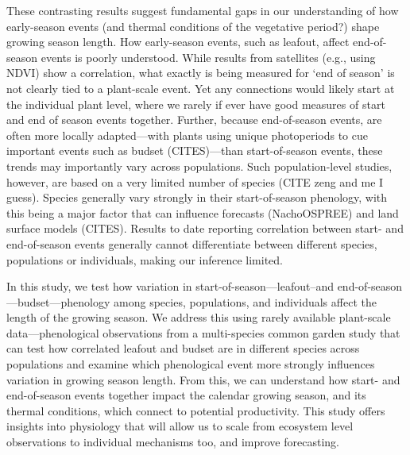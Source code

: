 \documentclass[12 pt]{article}
\begin{document}
These contrasting results suggest fundamental gaps in our understanding of how early-season events (and thermal conditions of the vegetative period?) shape growing season length. How early-season events, such as leafout, affect end-of-season events is poorly understood. While results from satellites (e.g., using NDVI) show a correlation,  what exactly is being measured for `end of season' is not clearly tied to a plant-scale event. Yet any connections would likely start at the individual plant level, where we rarely if ever have good measures of start and end of season events together. Further, because end-of-season events, are often more locally adapted---with plants using unique photoperiods to cue important events such as budset (CITES)---than start-of-season events, these trends may importantly vary across populations. Such population-level studies, however, are based on a very limited number of species (CITE zeng and me I guess). Species generally vary strongly in their start-of-season phenology, with this being a major factor that can influence forecasts (NachoOSPREE) and land surface models (CITES). Results to date reporting correlation between start- and end-of-season events generally cannot differentiate between different species, populations or individuals, making our inference limited. 

In this study, we test how variation in start-of-season---leafout--and end-of-season---budset---phenology among species, populations, and individuals affect the length of the growing season. We address this using rarely available plant-scale data---phenological observations from a multi-species common garden study that can test how correlated leafout and budset are in different species across populations and examine which phenological event more strongly influences variation in growing season length. From this, we can understand how start- and end-of-season events together impact the calendar growing season, and its thermal conditions, which connect to potential productivity. This study offers insights into physiology that will allow us to scale from ecosystem level observations to individual mechanisms too, and improve forecasting. %
\end{document}

